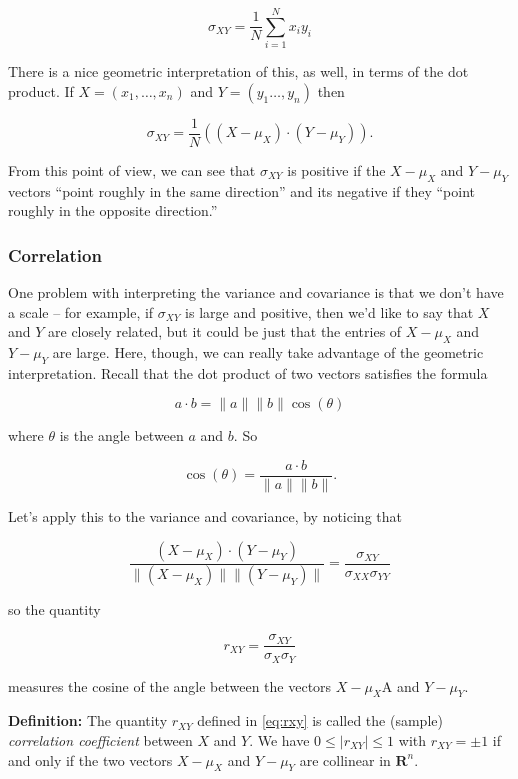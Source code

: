 \documentclass[
]{article}
\begin{document}
\begin{equation}
\sigma_{XY} = \frac{1}{N}\sum_{i=1}^{N} x_iy_i
\label{eq:covariancedot}\end{equation}

There is a nice geometric interpretation of this, as well, in terms of
the dot product. If \(X=(x_1,\ldots, x_n)\) and \(Y=(y_1\ldots,y_n)\)
then

\[
\sigma_{XY} = \frac{1}{N} ((X-\mu_{X})\cdot (Y-\mu_{Y})).
\]

From this point of view, we can see that \(\sigma_{XY}\) is positive if
the \(X-\mu_{X}\) and \(Y-\mu_{Y}\) vectors ``point roughly in the same
direction'' and its negative if they ``point roughly in the opposite
direction.''

\hypertarget{correlation}{%
\subsubsection{Correlation}\label{correlation}}

One problem with interpreting the variance and covariance is that we
don't have a scale -- for example, if \(\sigma_{XY}\) is large and
positive, then we'd like to say that \(X\) and \(Y\) are closely
related, but it could be just that the entries of \(X-\mu_{X}\) and
\(Y-\mu_{Y}\) are large. Here, though, we can really take advantage of
the geometric interpretation. Recall that the dot product of two vectors
satisfies the formula

\[
a \cdot b = \|a\|\|b\|\cos(\theta)
\]

where \(\theta\) is the angle between \(a\) and \(b\). So

\[
\cos(\theta) = \frac{a\cdot b}{\|a\|\|b\|}.
\]

Let's apply this to the variance and covariance, by noticing that

\[
\frac{(X-\mu_{X})\cdot (Y-\mu_{Y})}{\|(X-\mu_{X})\|\|(Y-\mu_{Y})\|} = \frac{\sigma_{XY}}{\sigma_{XX}\sigma_{YY}}
\]

so the quantity

\begin{equation}
r_{XY} = \frac{\sigma_{XY}}{\sigma_{X}\sigma_{Y}}
\label{eq:rxy}\end{equation}

measures the cosine of the angle between the vectors \(X-\mu_{X}\)A and
\(Y-\mu_{Y}\).

\textbf{Definition:} The quantity \(r_{XY}\) defined in \cref{eq:rxy} is
called the (sample) \emph{correlation coefficient} between \(X\) and
\(Y\). We have \(0\le |r_{XY}|\le 1\) with \(r_{XY}=\pm 1\) if and only
if the two vectors \(X-\mu_{X}\) and \(Y-\mu_{Y}\) are collinear in
\(\mathbf{R}^{n}\).
\end{document}
